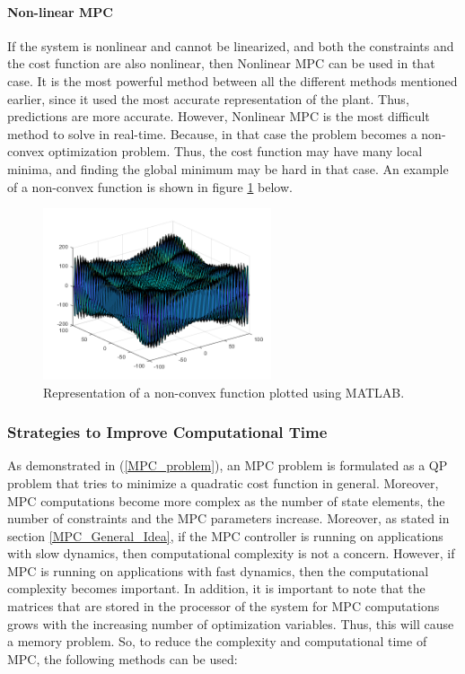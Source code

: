 \documentclass{thesisreport}
\begin{document}
\paragraph{Non-linear MPC} If the system is nonlinear and cannot be linearized, and both the constraints and the cost function are also nonlinear, then Nonlinear MPC can be used in that case. It is the most powerful method between all the different methods mentioned earlier, since it used the most accurate representation of the plant. Thus, predictions are more accurate. However, Nonlinear MPC is the most difficult method to solve in real-time. Because, in that case the problem becomes a non-convex optimization problem. Thus, the cost function may have many local minima, and finding the global minimum may be hard in that case. An example of a non-convex function is shown in figure \ref{nonconvex_function} below.


\begin{figure}[h]
\centering
\includegraphics[width=0.6\textwidth]{Images/Control/MPC_Nonconvex_Equation_b}
\caption{Representation of a non-convex function plotted using MATLAB.}
\label{nonconvex_function}
\end{figure}

\newpage

\subsubsection{Strategies to Improve Computational Time}

As demonstrated in (\ref{MPC_problem}), an MPC problem is formulated as a QP problem that tries to minimize a quadratic cost function in general. Moreover, MPC computations become more complex as the number of state elements, the number of constraints and the MPC parameters increase. Moreover, as stated in section \ref{MPC_General_Idea}, if the MPC controller is running on applications with slow dynamics, then computational complexity is not a concern. However, if MPC is running on applications with fast dynamics, then the computational complexity becomes important. In addition, it is important to note that the matrices that are stored in the processor of the system for MPC computations grows with the increasing number of optimization variables. Thus, this will cause a memory problem. So, to reduce the complexity and computational time of MPC, the following methods can be used:
\end{document}
